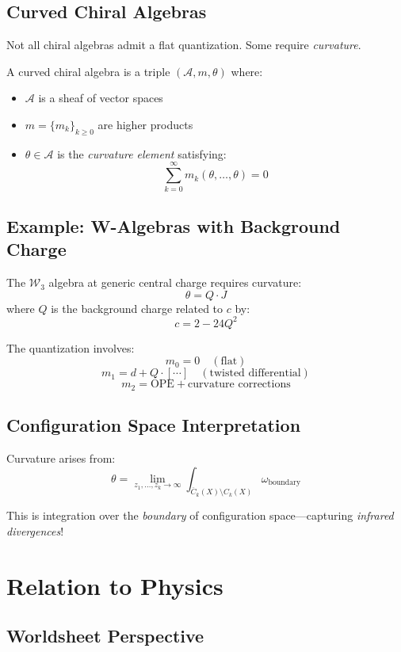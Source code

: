 \subsection{Curved Chiral Algebras}

Not all chiral algebras admit a flat quantization. Some require \emph{curvature}.

\begin{definition}
A curved chiral algebra is a triple $(\mathcal{A}, m, \theta)$ where:
\begin{itemize}
\item $\mathcal{A}$ is a sheaf of vector spaces
\item $m = \{m_k\}_{k \geq 0}$ are higher products
\item $\theta \in \mathcal{A}$ is the \emph{curvature element} satisfying:
$$\sum_{k=0}^\infty m_k(\theta, \ldots, \theta) = 0$$
\end{itemize}
\end{definition}

\subsection{Example: W-Algebras with Background Charge}

The $\mathcal{W}_3$ algebra at generic central charge requires curvature:
$$\theta = Q \cdot J$$
where $Q$ is the background charge related to $c$ by:
$$c = 2 - 24Q^2$$

The quantization involves:
$$m_0 = 0 \quad (\text{flat})$$
$$m_1 = d + Q \cdot [\cdots] \quad (\text{twisted differential})$$
$$m_2 = \text{OPE} + \text{curvature corrections}$$

\subsection{Configuration Space Interpretation}

Curvature arises from:
$$\theta = \lim_{z_1, \ldots, z_k \to \infty} \int_{\overline{C}_k(X) \setminus C_k(X)} \omega_{\text{boundary}}$$

This is integration over the \emph{boundary} of configuration space—capturing \emph{infrared divergences}!

\section{Relation to Physics}

\subsection{Worldsheet Perspective}

